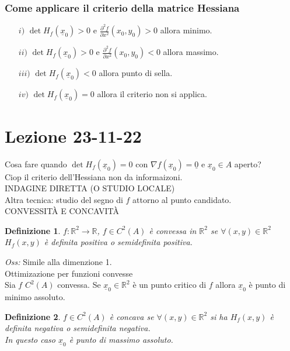 \documentclass{scrreprt}
\newtheorem{defn}{Definizione}
\newenvironment{definition}{\begin{mdframed}[backgroundcolor=Ivory2]\begin{defn}}{\end{defn}\end{mdframed}}
\begin{document}
\subsubsection{Come applicare il criterio della matrice Hessiana}
\begin{enumerate}
	\item[$i)$] $\det H_f(\underline{x}_0) > 0$ e $\frac{\partial^2 f}{\partial x^2}(x_0, y_0) > 0$ allora minimo.
	\item[$ii)$] $\det H_f(\underline{x}_0) > 0$ e $\frac{\partial^2 f}{\partial x^2}(x_0, y_0) < 0$ allora massimo.
	\item[$iii)$] $\det H_f(\underline{x}_0) < 0$ allora punto di sella.
	\item[$iv)$] $\det H_f(\underline{x}_0) = 0$ allora il criterio non si applica.
\end{enumerate}

\section*{Lezione 23-11-22}
Cosa fare quando $\det H_f(\underline{x}_0) = 0$ con $\nabla f(\underline{x}_0) = \underline{0}$ e $\underline{x}_0 \in A$ aperto?\\
Ciop il criterio dell'Hessiana non da informaizoni.\\

INDAGINE DIRETTA (O STUDIO LOCALE)\\
Altra tecnica: studio del segno di $f$ attorno al punto candidato.\\

CONVESSITÀ E CONCAVITÀ\\
\begin{definition}
	$f: \mathbb{R}^2 \to \mathbb{R}$, $f \in C^2(A)$ è convessa in $\mathbb{R}^2$ se $\forall (x,y) \in \mathbb{R}^2$ $H_f(x,y)$ è definita positiva o semidefinita positiva.\\
\end{definition}
\emph{Oss:} Simile alla dimenzione 1.\\

Ottimizazione per funzioni convesse\\ %
Sia $f$ $C^2(A)$ convessa.
Se $\underline{x}_0 \in \mathbb{R}^2$ è un punto critico di $f$ allora $\underline{x}_0$ è punto di minimo assoluto.

\begin{definition}
	$f \in C^2(A)$ è concava se $\forall (x,y) \in \mathbb{R}^2$ si ha $H_f(x,y)$ è definita negativa o semidefinita negativa.\\
	In questo caso $\underline{x}_0$ è punto di massimo assoluto.
\end{definition}
\end{document}
